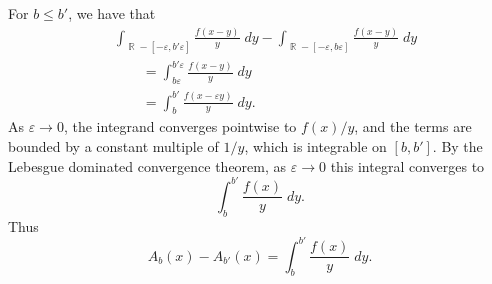 \documentclass[answers]{exam}
\DeclareMathOperator{\RR}{\mathbb{R}}
\begin{document}
\begin{questions}
\begin{solution}
	For $b \leq b'$, we have that
	\begin{align*}
		&\int_{\RR - [-\varepsilon,b'\varepsilon]} \frac{f(x-y)}{y}\; dy - \int_{\RR - [-\varepsilon,b\varepsilon]} \frac{f(x-y)}{y}\; dy\\
		&\quad\quad = \int_{b \varepsilon}^{b' \varepsilon} \frac{f(x-y)}{y}\; dy\\
		&\quad\quad = \int_b^{b'} \frac{f(x - \varepsilon y)}{y}\; dy.
	\end{align*}
	As $\varepsilon \to 0$, the integrand converges pointwise to $f(x) / y$, and the terms are bounded by a constant multiple of $1/y$, which is integrable on $[b,b']$. By the Lebesgue dominated convergence theorem, as $\varepsilon \to 0$ this integral converges to
	\[ \int_b^{b'} \frac{f(x)}{y}\; dy. \]
	Thus
	\[ A_b(x) - A_{b'}(x) = \int_b^{b'} \frac{f(x)}{y}\; dy.  \]
\end{solution}


\end{questions}
\end{document}
